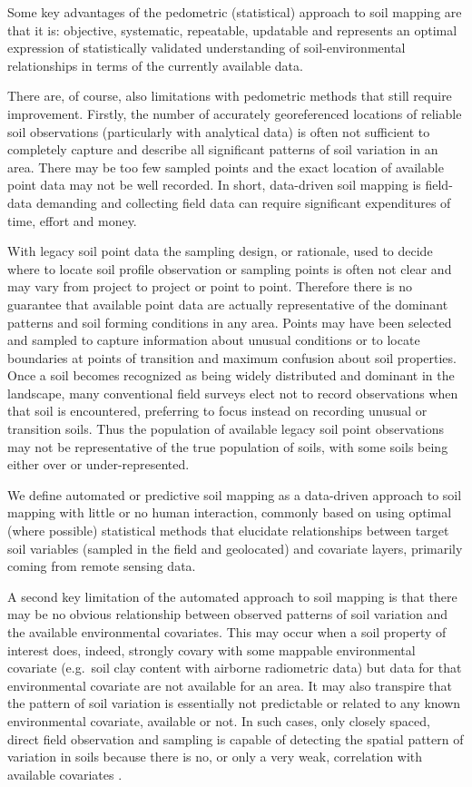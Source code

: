 \documentclass[graybox,natbib,nospthms,UStrade]{svmono}
\let\BeginKnitrBlock\begin \let\EndKnitrBlock\end
\let\BeginKnitrBlock\begin \let\EndKnitrBlock\end
\begin{document}
Some key advantages of the pedometric (statistical) approach to soil
mapping are that it is: objective, systematic, repeatable, updatable and
represents an optimal expression of statistically validated
understanding of soil-environmental relationships in terms of the
currently available data.

There are, of course, also limitations with pedometric methods that
still require improvement. Firstly, the number of accurately
georeferenced locations of reliable soil observations (particularly with
analytical data) is often not sufficient to completely capture and
describe all significant patterns of soil variation in an area. There
may be too few sampled points and the exact location of available point
data may not be well recorded. In short, data-driven soil mapping is
field-data demanding and collecting field data can require significant
expenditures of time, effort and money.

With legacy soil point data the sampling design, or rationale, used to
decide where to locate soil profile observation or sampling points is
often not clear and may vary from project to project or point to point.
Therefore there is no guarantee that available point data are actually
representative of the dominant patterns and soil forming conditions in
any area. Points may have been selected and sampled to capture
information about unusual conditions or to locate boundaries at points
of transition and maximum confusion about soil properties. Once a soil
becomes recognized as being widely distributed and dominant in the
landscape, many conventional field surveys elect not to record
observations when that soil is encountered, preferring to focus instead
on recording unusual or transition soils. Thus the population of
available legacy soil point observations may not be representative of
the true population of soils, with some soils being either over or
under-represented.

\BeginKnitrBlock{rmdnote}
We define automated or predictive soil mapping as
a data-driven approach to soil mapping with little or no human
interaction, commonly based on using optimal (where possible)
statistical methods that elucidate relationships between target soil
variables (sampled in the field and geolocated) and covariate layers,
primarily coming from remote sensing data.
\EndKnitrBlock{rmdnote}

A second key limitation of the automated approach to soil
mapping is that there may be no obvious relationship between observed
patterns of soil variation and the available environmental covariates.
This may occur when a soil property of interest does, indeed, strongly covary
with some mappable environmental covariate (e.g.~soil clay content with
airborne radiometric data) but data for that environmental covariate are
not available for an area. It may also transpire that the pattern of
soil variation is essentially not predictable or related to any known
environmental covariate, available or not. In such cases, only closely
spaced, direct field observation and sampling is capable of detecting
the spatial pattern of variation in soils because there is no, or only a
very weak, correlation with available covariates \citep{kondolf2003tools}.
\end{document}
